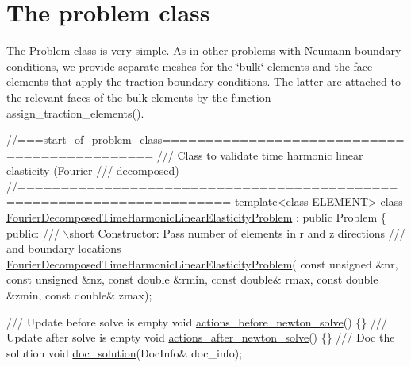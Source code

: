  

\hypertarget{index_problem}{}\section{The problem class}\label{index_problem}
The {\ttfamily Problem} class is very simple. As in other problems with Neumann boundary conditions, we provide separate meshes for the \char`\"{}bulk\char`\"{} elements and the face elements that apply the traction boundary conditions. The latter are attached to the relevant faces of the bulk elements by the function {\ttfamily assign\+\_\+traction\+\_\+elements()}.

 
\begin{DoxyCodeInclude}
\textcolor{comment}{//===start\_of\_problem\_class=============================================}
\textcolor{comment}{/// Class to validate time harmonic linear elasticity (Fourier }
\textcolor{comment}{}\textcolor{comment}{/// decomposed)}
\textcolor{comment}{}\textcolor{comment}{//======================================================================}
\textcolor{keyword}{template}<\textcolor{keyword}{class} ELEMENT>
\textcolor{keyword}{class }\hyperlink{classFourierDecomposedTimeHarmonicLinearElasticityProblem}{FourierDecomposedTimeHarmonicLinearElasticityProblem}
       : \textcolor{keyword}{public} Problem
\{
\textcolor{keyword}{public}:
\textcolor{comment}{}
\textcolor{comment}{ /// \(\backslash\)short Constructor: Pass number of elements in r and z directions }
\textcolor{comment}{ /// and boundary locations}
\textcolor{comment}{} \hyperlink{classFourierDecomposedTimeHarmonicLinearElasticityProblem_a52597ec969cbd2aaa9fde263594c1c32}{FourierDecomposedTimeHarmonicLinearElasticityProblem}(
 \textcolor{keyword}{const} \textcolor{keywordtype}{unsigned} &nr, \textcolor{keyword}{const} \textcolor{keywordtype}{unsigned} &nz,
 \textcolor{keyword}{const} \textcolor{keywordtype}{double} &rmin, \textcolor{keyword}{const} \textcolor{keywordtype}{double}& rmax,
 \textcolor{keyword}{const} \textcolor{keywordtype}{double} &zmin, \textcolor{keyword}{const} \textcolor{keywordtype}{double}& zmax);

 \textcolor{comment}{}
\textcolor{comment}{ /// Update before solve is empty}
\textcolor{comment}{} \textcolor{keywordtype}{void} \hyperlink{classFourierDecomposedTimeHarmonicLinearElasticityProblem_ad9a3f48c3b399c4595f73d3f1e9a14ef}{actions\_before\_newton\_solve}() \{\}
\textcolor{comment}{}
\textcolor{comment}{ /// Update after solve is empty}
\textcolor{comment}{} \textcolor{keywordtype}{void} \hyperlink{classFourierDecomposedTimeHarmonicLinearElasticityProblem_ac5c25fb4658eaef91104ef7be1b0d25e}{actions\_after\_newton\_solve}() \{\}
 \textcolor{comment}{}
\textcolor{comment}{ /// Doc the solution}
\textcolor{comment}{} \textcolor{keywordtype}{void} \hyperlink{classFourierDecomposedTimeHarmonicLinearElasticityProblem_af328e5b2260377fa7df04b727ca130bd}{doc\_solution}(DocInfo& doc\_info);
 

\end{DoxyCodeInclude}
